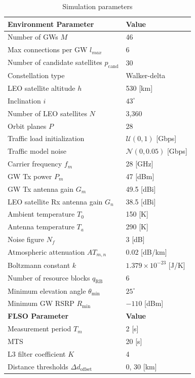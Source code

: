 \begin{table}[p]
\centering
\caption{Simulation parameters}
\label{tab:sim_params}
\begin{tabular}{l l}
\hline
\textbf{Environment Parameter~\cite{FCC2020, 3gppfeeder}} & \textbf{Value} \\
\hline
Number of GWs $M$ & 46 \\
Max connections per GW $l_{max}$ & 6 \\
Number of candidate satellites $p_{\mathrm{cand}}$ & 30 \\
Constellation type & Walker-delta \\
LEO satellite altitude $h$ & 530 [km] \\
Inclination $i$ & $43^\circ$ \\
Number of LEO satellites $N$ & 3,360 \\
Orbit planes $P$ & 28 \\
Traffic load initialization & $\mathcal{U}(0, 1)$ [Gbps]\\
Traffic model noise & $\mathcal{N}(0, 0.05)$ [Gbps]\\
Carrier frequency $f_m$ & 28 [GHz] \\
GW Tx power $P_m$ & 47 [dBm] \\
GW Tx antenna gain $G_m$ & 49.5 [dBi] \\
LEO satellite Rx antenna gain $G_n$ & 38.5 [dBi] \\
Ambient temperature $T_0$ & 150 [K] \\
Antenna temperature $T_a$ & 290 [K] \\
Noise figure $N_f$ & 3 [dB] \\
Atmospheric attenuation $AT_{m,n}$ & 0.02 [dB/km] \\
Boltzmann constant $k$ & $1.379 \times 10^{-23}$ [J/K] \\
Number of resource blocks $q_{\mathrm{RB}}$ & 6 \\
Minimum elevation angle $\theta_{\min}$ & $25^\circ$ \\
Minimum GW RSRP $R_{\min}$ & $-110$ [dBm] \\
\hline
\textbf{FLSO Parameter} & \textbf{Value} \\
\hline
Measurement period $T_m$ & 2 [s] \\
MTS & 20 [s] \\
L3 filter coefficient $K$ & 4 \\
Distance thresholds $\Delta d_{\mathrm{offset}}$ & 0, 30 [km] \\

\end{tabular}
\end{table}
